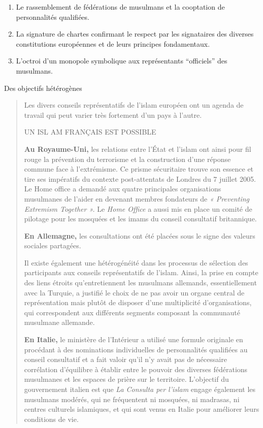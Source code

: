 \begin{enumerate}
\def\labelenumi{\arabic{enumi}.}
\item
  Le rassemblement de fédérations de musulmans et la cooptation de
  personnalités qualifiées.
\item
  La signature de chartes confirmant le respect par les signataires des
  diverses constitutions européennes et de leurs principes fondamentaux.
\item
  L'octroi d'un monopole symbolique aux représentants ``officiels'' des
  musulmans.
\end{enumerate}

Des objectifs hétérogènes

\begin{quote}
Les divers conseils représentatifs de l'islam européen ont un agenda de
travail qui peut varier très fortement d'un pays à l'autre.

UN ISL AM FRANÇAIS EST POSSIBLE

\textbf{Au Royaume-Uni,} les relations entre l'État et l'islam ont ainsi
pour fil rouge la prévention du terrorisme et la construction d'une
réponse commune face à l'extrémisme. Ce prisme sécuritaire trouve son
essence et tire ses impératifs du contexte post-attentats de Londres du
7 juillet 2005. Le Home office a demandé aux quatre principales
organisations musulmanes de l'aider en devenant membres fondateurs de
\emph{« Preventing Extremism Together ».} Le \emph{Home Office} a aussi
mis en place un comité de pilotage pour les mosquées et les imams du
conseil consultatif britannique.

\textbf{En Allemagne,} les consultations ont été placées sous le signe
des valeurs sociales partagées.

Il existe également une hétérogénéité dans les processus de sélection
des participants aux conseils représentatifs de l'islam. Ainsi, la prise
en compte des liens étroits qu'entretiennent les musulmans allemands,
essentiellement avec la Turquie, a justifié le choix de ne pas avoir un
organe central de représentation mais plutôt de disposer d'une
multiplicité d'organisations, qui correspondent aux différents segments
composant la communauté musulmane allemande.

\textbf{En Italie,} le ministère de l'Intérieur a utilisé une formule
originale en procédant à des nominations individuelles de personnalités
qualifiées au conseil consultatif et a fait valoir qu'il n'y avait pas
de nécessaire corrélation d'équilibre à établir entre le pouvoir des
diverses fédérations musulmanes et les espaces de prière sur le
territoire. L'objectif du gouvernement italien est que \emph{La Consulta
per l'islam} engage également les musulmans modérés, qui ne fréquentent
ni mosquées, ni madrasas, ni centres culturels islamiques, et qui sont
venus en Italie pour améliorer leurs conditions de vie.


\end{quote}
